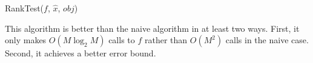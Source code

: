 \begin{algorithm}
    \caption{RankTest($f$, $\hat{x}$, $obj$)}
    \label{alg:rank_test}
\end{algorithm}
This algorithm is better than the naive algorithm in at least two ways. First, it only makes \(O(M \log_2 M)\) calls to \(f\) rather than \(O(M^2)\) calls in the naive case. Second, it achieves a better error bound.